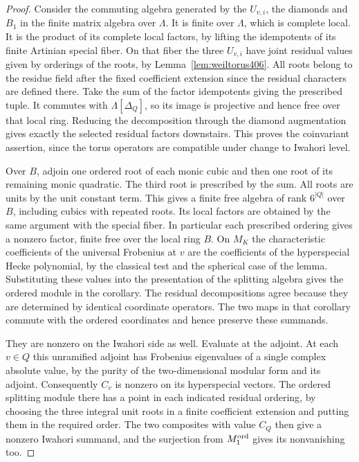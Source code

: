 \documentclass[a4paper,11pt]{article}
\theoremstyle{definition}
\theoremstyle{remark}
\numberwithin{equation}{section}
\begin{document}
\begin{proof}
Consider the commuting algebra generated by the \(U_{v,i}\),
the diamonds and \(B_1\) in the finite matrix algebra over
\(\Lambda\). It is finite over \(\Lambda\), which is complete
local. It is the product of its complete local factors, by
lifting the idempotents of its finite Artinian special fiber.
On that fiber the three \(U_{v,i}\) have joint residual values
given by orderings of the roots, by Lemma~\ref{lem:weiltorus406}.
All roots belong to the residue field after the fixed
coefficient extension since the residual characters are
defined there. Take the sum of the factor idempotents giving
the prescribed tuple. It commutes with \(\Lambda[\Delta_Q]\),
so its image is projective and hence free over that local
ring. Reducing the decomposition through the diamond
augmentation gives exactly the selected residual factors
downstairs. This proves the coinvariant assertion, since the
torus operators are compatible under change to Iwahori level.

Over \(B\), adjoin one ordered root of each monic cubic and
then one root of its remaining monic quadratic. The third
root is prescribed by the sum. All roots are units by the
unit constant term. This gives a finite free algebra of rank
\(6^{|Q|}\) over \(B\), including cubics with repeated roots.
Its local factors are obtained by the same argument with
the special fiber. In particular each prescribed ordering
gives a nonzero factor, finite free over the local ring
\(B\). On \(M_K\) the characteristic coefficients of the
universal Frobenius at \(v\) are the coefficients of the
hyperspecial Hecke polynomial, by the classical test and
the spherical case of the lemma. Substituting these values
into the presentation of the splitting algebra gives the
ordered module in the corollary. The residual decompositions
agree because they are determined by identical coordinate
operators. The two maps in that corollary commute with the
ordered coordinates and hence preserve these summands.

They are nonzero on the Iwahori side as well. Evaluate at
the adjoint. At each \(v\in Q\) this unramified adjoint has
Frobenius eigenvalues of a single complex absolute value,
by the purity of the two-dimensional modular form and
its adjoint. Consequently \(C_v\) is nonzero on its
hyperspecial vectors. The ordered splitting module there
has a point in each indicated residual ordering, by choosing
the three integral unit roots in a finite coefficient
extension and putting them in the required order. The
two composites with value \(C_Q\) then give a nonzero
Iwahori summand, and the surjection from \(M_1^{\rm ord}\)
gives its nonvanishing too.
\end{proof}
\end{document}
